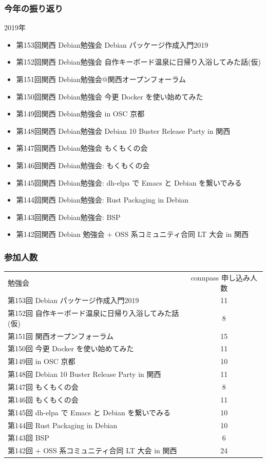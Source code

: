 \documentclass[cjk,dvipdfmx,10pt,compress,%
hyperref={bookmarks=true,bookmarksnumbered=true,bookmarksopen=false,%
colorlinks=false,%
pdftitle={第 153 回 関西 Debian 勉強会},%
pdfauthor={おおつき},%
pdfsubject={資料},%
}]{beamer}
\begin{document}
\begin{frame}[fragile]
  \frametitle{今年の振り返り}
  \begin{block}{2019年}
    \begin{itemize}
  	\item 第153回関西 Debian勉強会 Debian パッケージ作成入門2019
  	\item 第152回関西 Debian勉強会 自作キーボード温泉に日帰り入浴してみた話(仮) 
  	\item 第151回関西 Debian勉強会@関西オープンフォーラム
  	\item 第150回関西 Debian勉強会 今更 Docker を使い始めてみた
  	\item 第149回関西 Debian勉強会 in OSC 京都
  	\item 第148回関西 Debian勉強会 Debian 10 Buster Release Party in 関西
  	\item 第147回関西 Debian勉強会 もくもくの会
  	\item 第146回関西 Debian勉強会: もくもくの会
  	\item 第145回関西 Debian勉強会: dh-elpa で Emacs と Debian を繋いでみる
  	\item 第144回関西 Debian勉強会: Rust Packaging in Debian
  	\item 第143回関西 Debian勉強会: BSP
  	\item 第142回関西 Debian 勉強会 + OSS 系コミュニティ合同 LT 大会 in 関西
    \end{itemize}
  \end{block}
\end{frame}

\begin{frame}[fragile]
  \frametitle{参加人数}
	\begin{small}
  \begin{tabular}{lc}
	  勉強会 & connpass 申し込み人数 \\
	  第153回 Debian パッケージ作成入門2019 & 11 \\
	  第152回 自作キーボード温泉に日帰り入浴してみた話(仮) & 8 \\ 
	  第151回 関西オープンフォーラム & 15 \\
	  第150回 今更 Docker を使い始めてみた & 11\\
	  第149回 in OSC 京都 & 10\\
	  第148回 Debian 10 Buster Release Party in 関西 & 11\\
	  第147回 もくもくの会 & 8\\
	  第146回 もくもくの会 & 11\\
	  第145回 dh-elpa で Emacs と Debian を繋いでみる & 10\\
	  第144回 Rust Packaging in Debian & 10\\
	  第143回 BSP & 6 \\
	  第142回 + OSS 系コミュニティ合同 LT 大会 in 関西 & 24 
  \end{tabular}
	\end{small}
\end{frame}
\end{document}
